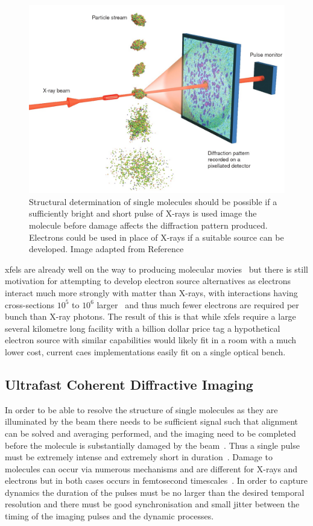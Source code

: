\begin{figure}
    \center
    \includegraphics[width=0.65\linewidth]{0intro/Figs/single_molecule_cdi.jpg}
    \caption[Structural determination of single molecules.]{Structural determination of single molecules should be possible if a sufficiently bright and short pulse of X-rays is used image the molecule before damage affects the diffraction pattern produced. Electrons could be used in place of X-rays if a suitable source can be developed. Image adapted from Reference~\cite{gaffney_imaging_2007}}
    \label{figure:molecule_cdi}
\end{figure}

\Glspl{xfel} are already well on the way to producing molecular movies~\cite{pande_femtosecond_2016,nango_three-dimensional_2016} but there is still motivation for attempting to develop electron source alternatives as electrons interact much more strongly with matter than X-rays, with interactions having cross-sections $10^5$ to $10^6$ larger~\cite{sciaini_femtosecond_2011} and thus much fewer electrons are required per bunch than X-ray photons.
The result of this is that while \glspl{xfel} require a large several kilometre long facility with a billion dollar price tag a hypothetical electron source with similar capabilities would likely fit in a room with a much lower cost, current \gls{caes} implementations easily fit on a single optical bench.

\subsection{Ultrafast Coherent Diffractive Imaging}

In order to be able to resolve the structure of single molecules as they are illuminated by the beam there needs to be sufficient signal such that alignment can be solved and averaging performed, and the imaging need to be completed before the molecule is substantially damaged by the beam~\cite{huldt_diffraction_2003}.
Thus a single pulse must be extremely intense and extremely short in duration~\cite{chapman_femtosecond_2006}.
Damage to molecules can occur via numerous mechanisms and are different for X-rays and electrons but in both cases occurs in femtosecond timescales~\cite{spence_outrunning_2017}.
In order to capture dynamics the duration of the pulses must be no larger than the desired temporal resolution and there must be good synchronisation and small jitter between the timing of the imaging pulses and the dynamic processes.

